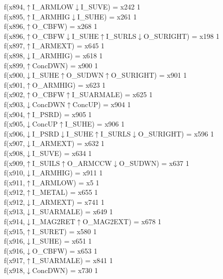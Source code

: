 f(x894,$\uparrow$I\_ARMLOW$\downarrow$I\_SUVE) = x242 {1} \\
f(x895,$\uparrow$I\_ARMHIG$\downarrow$I\_SUHE) = x261 {1} \\
f(x896,$\uparrow$O\_CBFW) = x268 {1} \\
f(x896,$\uparrow$O\_CBFW$\downarrow$I\_SUHE$\uparrow$I\_SURLS$\downarrow$O\_SURIGHT) = x198 {1} \\
f(x897,$\uparrow$I\_ARMEXT) = x645 {1} \\
f(x898,$\downarrow$I\_ARMHIG) = x618 {1} \\
f(x899,$\uparrow$ConcDWN) = x900 {1} \\
f(x900,$\downarrow$I\_SUHE$\uparrow$O\_SUDWN$\uparrow$O\_SURIGHT) = x901 {1} \\
f(x901,$\uparrow$O\_ARMHIG) = x623 {1} \\
f(x902,$\uparrow$O\_CBFW$\uparrow$I\_SUARMALE) = x625 {1} \\
f(x903,$\downarrow$ConcDWN$\uparrow$ConcUP) = x904 {1} \\
f(x904,$\uparrow$I\_PSRD) = x905 {1} \\
f(x905,$\downarrow$ConcUP$\uparrow$I\_SUHE) = x906 {1} \\
f(x906,$\downarrow$I\_PSRD$\downarrow$I\_SUHE$\uparrow$I\_SURLS$\downarrow$O\_SURIGHT) = x596 {1} \\
f(x907,$\downarrow$I\_ARMEXT) = x632 {1} \\
f(x908,$\downarrow$I\_SUVE) = x634 {1} \\
f(x909,$\uparrow$I\_SUILS$\uparrow$O\_ARMCCW$\downarrow$O\_SUDWN) = x637 {1} \\
f(x910,$\downarrow$I\_ARMHIG) = x911 {1} \\
f(x911,$\uparrow$I\_ARMLOW) = x5 {1} \\
f(x912,$\uparrow$I\_METAL) = x655 {1} \\
f(x912,$\downarrow$I\_ARMEXT) = x741 {1} \\
f(x913,$\downarrow$I\_SUARMALE) = x649 {1} \\
f(x914,$\downarrow$I\_MAG2RET$\uparrow$O\_MAG2EXT) = x678 {1} \\
f(x915,$\uparrow$I\_SURET) = x580 {1} \\
f(x916,$\downarrow$I\_SUHE) = x651 {1} \\
f(x916,$\downarrow$O\_CBFW) = x653 {1} \\
f(x917,$\uparrow$I\_SUARMALE) = x841 {1} \\
f(x918,$\downarrow$ConcDWN) = x730 {1} \\
